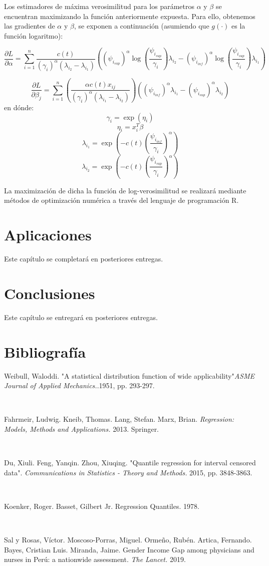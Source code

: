 \documentclass{report}
\begin{document}
Los estimadores de máxima verosimilitud para los parámetros $\alpha$ y $\beta$ se encuentran maximizando la función anteriormente expuesta. Para ello, obtenemos las gradientes de $\alpha$ y $\beta$, se exponen a continuación (asumiendo que $g(\cdot)$ es la función logaritmo):

\[\frac{\partial L}{\partial \alpha}=\sum_{i=1}^{n} \frac{c(t)}{(\gamma_{i})^{\alpha}(\lambda_{i_{2}}-\lambda_{i_{1}})}\left( (\psi_{i_{sup}})^{\alpha} \log\left( \frac{\psi_{i_{sup}}}{\gamma_{i}} \right) \lambda_{i_{2}} - (\psi_{i_{inf}})^{\alpha} \log\left( \frac{\psi_{i_{sup}}}{\gamma_{i}} \right) \lambda_{i_{1}}\right)\]

\[\frac{\partial L}{\partial \beta_{j}}=\sum_{i=1}^{n} \left(\frac{\alpha c(t) x_{ij}}{(\gamma_{i})^{\alpha}(\lambda_{i_{1}}-\lambda_{i_{2}})}\right) \left( (\psi_{i_{inf}})^{\alpha}\lambda_{i_{1}} - (\psi_{i_{sup}})^{\alpha} \lambda_{i_{2}} \right)\]
\noindent en dónde:
\[ \gamma_{i} = \exp(\eta_{i})\]
\[ \eta_{i} = x_{i}^{T}\beta\]
\[ \lambda_{i_{1}} = \exp\left( -c(t) \left(\frac{\psi_{i_{inf}}}{\gamma_{i}}\right)^{\alpha} \right)\]
\[ \lambda_{i_{2}} = \exp\left( -c(t) \left(\frac{\psi_{i_{sup}}}{\gamma_{i}}\right)^{\alpha} \right)\]

La maximización de dicha la función de log-verosimilitud se realizará mediante métodos de optimización numérica a través del lenguaje de programación R.
	
\chapter{Aplicaciones}

Este capítulo se completará en posteriores entregas.

\chapter{Conclusiones}

Este capítulo se entregará en posteriores entregas.
\chapter{Bibliografía}


Weibull, Waloddi. "A statistical distribution function of wide applicability"\textit{ASME Journal of Applied Mechanics.}.1951, pp. 293-297.

\

Fahrmeir, Ludwig. Kneib, Thomas. Lang, Stefan. Marx, Brian. \textit{Regression: Models, Methods and Applications.} 2013. Springer.

\

Du, Xiuli. Feng, Yanqin. Zhou, Xiuqing. "Quantile regression for interval censored data". \textit{Communications in Statistics - Theory and Methods.} 2015, pp. 3848-3863.

\

Koenker, Roger. Basset, Gilbert Jr. Regression Quantiles. 1978.

\

Sal y Rosas, Víctor. Moscoso-Porras, Miguel. Ormeño, Rubén. Artica, Fernando. Bayes, Cristian Luis. Miranda, Jaime. Gender Income Gap among physicians and nurses in Perú: a nationwide assessment. \textit{The Lancet.} 2019.
\end{document}
